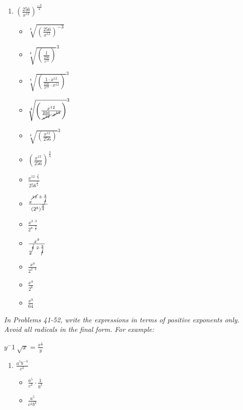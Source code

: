 \documentclass{article}
\begin{document}
\begin{onehalfspace}
\begin{enumerate}[start=29]
        \item $\left( \frac{256}{x^{12}} \right)^{\frac{-3}{4}}$
        \begin{itemize}
            \item $\sqrt[4]{\left( \frac{256}{x^{12}} \right)^{-3}}$
            \item $\sqrt[4]{\left( \frac{1}{\frac{256}{x^{12}}} \right)}^{3}$
            \item $\sqrt[4]{\left( \frac{1 \cdot x^{12}}{\frac{256}{x^{12}} \cdot x^{12}} \right)}^{3}$
            \item $\sqrt[4]{\left( \frac{x^{12}}{\frac{256}{\cancel{x^{12}}} \cdot \cancel{x^{12}}} \right)}^{3}$
            \item $\sqrt[4]{\left( \frac{x^{12}}{256} \right)}^{3}$
            \item $\left( \frac{x^{12}}{256} \right)^{\frac{3}{4}}$
            \item $\frac{x^{12 \cdot \frac{3}{4}}}{256^{\frac{3}{4}}}$
            \item $\frac{x^{\cancel{12} \ 3 \cdot \frac{3}{\cancel{4}}}}{(2^{8})^{\frac{3}{4}}}$
            \item $\frac{x^{3 \cdot 3}}{2^{8 \cdot \frac{3}{4}}}$
            \item $\frac{x^{9}}{2^{\cancel{8} \ 2 \cdot \frac{3}{\cancel{4}}}}$
            \item $\frac{x^{9}}{2^{2 \cdot 3}}$
            \item $\frac{x^{9}}{2^{6}}$
            \item $\frac{x^{9}}{64}$
        \end{itemize}
    \end{enumerate}

    \textit{In Problems 41-52, write the expressions in terms of positive
     exponents only. Avoid all radicals in the final form. For example:}

     \begin{center}
        $y^-1 \ \sqrt{x} = \frac{x^{\frac{1}{2}}}{y}$
     \end{center}

     \begin{enumerate}[start=41]
        \item $\frac{a^{5}b^{-3}}{c^{2}}$
        \begin{itemize}
            \item $\frac{a^{5}}{c^{2}} \cdot \frac{1}{b^{3}}$
            \item $\frac{a^{5}}{c^{2}b^{3}}$
        \end{itemize}


\end{enumerate}
\end{onehalfspace}
\end{document}
